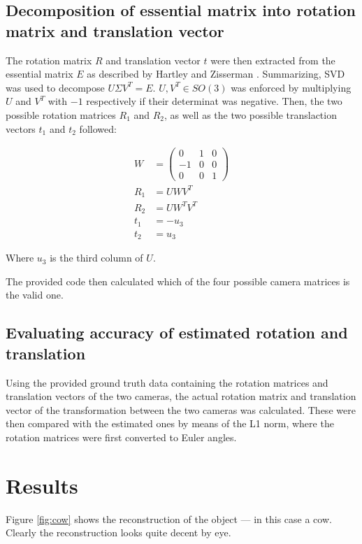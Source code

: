 \documentclass[a4paper]{scrreprt}
\begin{document}
\section{Decomposition of essential matrix into rotation matrix and translation vector}

The rotation matrix $R$ and translation vector $t$ were then extracted from the
essential matrix $E$ as described by Hartley and Zisserman
\autocite{hartleyMultipleViewGeometry2003}. Summarizing, SVD was used to
decompose $U \Sigma V^T = E$. $U, V^T \in SO(3)$ was enforced by multiplying $U$
and $V^T$ with $-1$ respectively if their determinat was negative. Then, the two
possible rotation matrices $R_1$ and $R_2$, as well as the two possible
translaction vectors $t_1$ and $t_2$ followed:

\begin{align*}
		W & = \begin{pmatrix}
				0 & 1 & 0 \\
				-1 & 0 & 0 \\
				0 & 0 & 1
		\end{pmatrix} \\
		R_1 & = U W V^T \\
		R_2 & = U W^T V^T \\
		t_1 & = -u_3 \\
		t_2 & = u_3
\end{align*}

Where $u_3$ is the third column of $U$.

The provided code then calculated which of the four possible camera matrices is
the valid one.

\section{Evaluating accuracy of estimated rotation and translation}

Using the provided ground truth data containing the rotation matrices and
translation vectors of the two cameras, the actual rotation matrix and
translation vector of the transformation between the two cameras was
calculated. These were then compared with the estimated ones by means of the L1
norm, where the rotation matrices were first converted to Euler angles.

\chapter{Results}

Figure \ref{fig:cow} shows the reconstruction of the object --- in this case a
cow. Clearly the reconstruction looks quite decent by eye.
\end{document}
